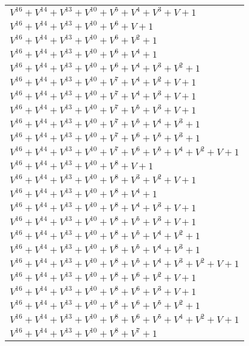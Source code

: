 \documentclass[12pt]{article}
\begin{document}
\begin{adjustwidth}{-4cm}{}
\begin{center}
\begin{longtable}{|l|}
$V^{16}  +V^{14}  +V^{13}  +V^{10}  +V^{5}  +V^{4}  +V^{3}  + V + 1$ \\
$V^{16}  +V^{14}  +V^{13}  +V^{10}  +V^{6}  + V + 1$ \\
$V^{16}  +V^{14}  +V^{13}  +V^{10}  +V^{6}  +V^{2}  + 1$ \\
$V^{16}  +V^{14}  +V^{13}  +V^{10}  +V^{6}  +V^{4}  + 1$ \\
$V^{16}  +V^{14}  +V^{13}  +V^{10}  +V^{6}  +V^{4}  +V^{3}  +V^{2}  + 1$ \\
$V^{16}  +V^{14}  +V^{13}  +V^{10}  +V^{7}  +V^{4}  +V^{2}  + V + 1$ \\
$V^{16}  +V^{14}  +V^{13}  +V^{10}  +V^{7}  +V^{4}  +V^{3}  + V + 1$ \\
$V^{16}  +V^{14}  +V^{13}  +V^{10}  +V^{7}  +V^{5}  +V^{3}  + V + 1$ \\
$V^{16}  +V^{14}  +V^{13}  +V^{10}  +V^{7}  +V^{5}  +V^{4}  +V^{3}  + 1$ \\
$V^{16}  +V^{14}  +V^{13}  +V^{10}  +V^{7}  +V^{6}  +V^{5}  +V^{3}  + 1$ \\
$V^{16}  +V^{14}  +V^{13}  +V^{10}  +V^{7}  +V^{6}  +V^{5}  +V^{4}  +V^{2}  + V + 1$ \\
$V^{16}  +V^{14}  +V^{13}  +V^{10}  +V^{8}  + V + 1$ \\
$V^{16}  +V^{14}  +V^{13}  +V^{10}  +V^{8}  +V^{3}  +V^{2}  + V + 1$ \\
$V^{16}  +V^{14}  +V^{13}  +V^{10}  +V^{8}  +V^{4}  + 1$ \\
$V^{16}  +V^{14}  +V^{13}  +V^{10}  +V^{8}  +V^{4}  +V^{3}  + V + 1$ \\
$V^{16}  +V^{14}  +V^{13}  +V^{10}  +V^{8}  +V^{5}  +V^{3}  + V + 1$ \\
$V^{16}  +V^{14}  +V^{13}  +V^{10}  +V^{8}  +V^{5}  +V^{4}  +V^{2}  + 1$ \\
$V^{16}  +V^{14}  +V^{13}  +V^{10}  +V^{8}  +V^{5}  +V^{4}  +V^{3}  + 1$ \\
$V^{16}  +V^{14}  +V^{13}  +V^{10}  +V^{8}  +V^{5}  +V^{4}  +V^{3}  +V^{2}  + V + 1$ \\
$V^{16}  +V^{14}  +V^{13}  +V^{10}  +V^{8}  +V^{6}  +V^{2}  + V + 1$ \\
$V^{16}  +V^{14}  +V^{13}  +V^{10}  +V^{8}  +V^{6}  +V^{3}  + V + 1$ \\
$V^{16}  +V^{14}  +V^{13}  +V^{10}  +V^{8}  +V^{6}  +V^{5}  +V^{2}  + 1$ \\
$V^{16}  +V^{14}  +V^{13}  +V^{10}  +V^{8}  +V^{6}  +V^{5}  +V^{4}  +V^{2}  + V + 1$ \\
$V^{16}  +V^{14}  +V^{13}  +V^{10}  +V^{8}  +V^{7}  + 1$ \\

\end{longtable}
\end{center}
\end{adjustwidth}
\end{document}
